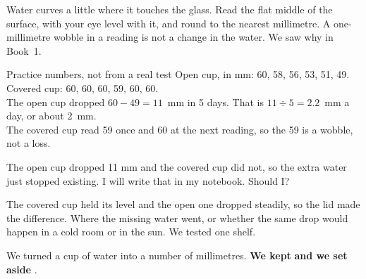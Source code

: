 Water curves a little where it touches the glass. Read the flat middle of the surface, with your eye level with it, and round to the nearest millimetre. A one-millimetre wobble in a reading is not a change in the water. We saw why in Book~1.

\begin{worked}{Practice numbers, not from a real test}
Open cup, in mm: 60, 58, 56, 53, 51, 49. Covered cup: 60, 60, 60, 59, 60, 60.\\
The open cup dropped $60-49=11$~mm in 5 days. That is $11\div5=2.2$~mm a day, or about 2~mm.\\
The covered cup read 59 once and 60 at the next reading, so the 59 is a wobble, not a loss.
\end{worked}

\begin{center}
\end{center}

\begin{multix}[hmm]\multixbot[hmm]\tcblower
The open cup dropped 11 mm and the covered cup did not, so the extra water just stopped existing. I will write that in my notebook. Should I?
\end{multix}

{The covered cup held its level and the open one dropped steadily, so the lid made the difference.}
{Where the missing water went, or whether the same drop would happen in a cold room or in the sun. We tested one shelf.}

\begin{keepbox}
We turned a cup of water into a number of millimetres. \textbf{We kept} \wline[3.4cm] \textbf{and we set aside} \wline[3.4cm].
\end{keepbox}

